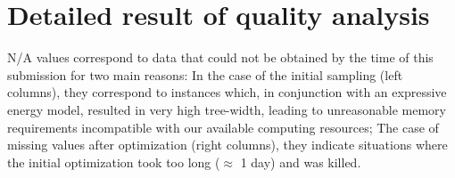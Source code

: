 \documentclass{bioinfo}
\begin{document}
\section{Detailed result of quality analysis}\label{sec:validity}
N/A values correspond to data that could not be obtained by the time of this submission for two main reasons: In the case of the initial sampling (left columns), they correspond to instances which, in conjunction with an expressive energy model, resulted in very high tree-width, leading to unreasonable memory requirements incompatible with our available computing resources; The case of missing values after optimization  (right columns), they indicate situations where the initial optimization took too long ($\approx$ 1 day) and was killed.

\end{document}

